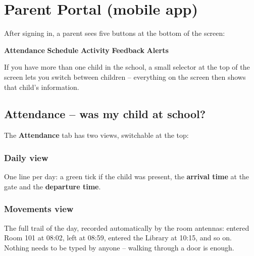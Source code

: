 \chapter{Parent Portal (mobile app)}

After signing in, a parent sees five buttons at the bottom of the
screen:

\begin{center}
\textbf{Attendance} \quad \textbf{Schedule} \quad \textbf{Activity}
\quad \textbf{Feedback} \quad \textbf{Alerts}
\end{center}

If you have more than one child in the school, a small selector at the
top of the screen lets you switch between children -- everything on the
screen then shows that child's information.

\section{Attendance -- was my child at school?}

The \textbf{Attendance} tab has two views, switchable at the top:

\subsection{Daily view}
One line per day: a green tick if the child was present, the
\textbf{arrival time} at the gate and the \textbf{departure time}.

\subsection{Movements view}
The full trail of the day, recorded automatically by the room antennas:
entered Room 101 at 08:02, left at 08:59, entered the Library at 10:15,
and so on. Nothing needs to be typed by anyone -- walking through a door
is enough.

